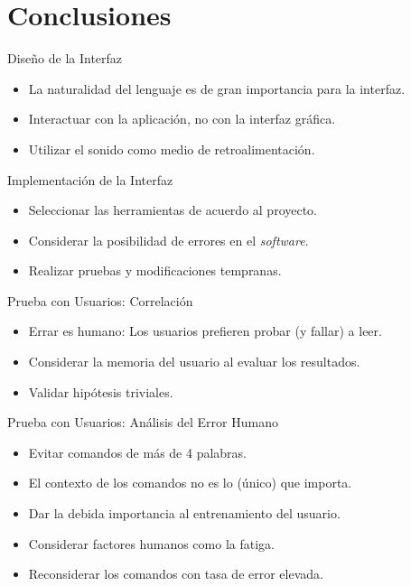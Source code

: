 \section{Conclusiones}

\begin{frame}{Dise\~no de la Interfaz}

\begin{itemize}
    \item La naturalidad del lenguaje es de gran importancia para la interfaz.
    \item Interactuar con la aplicaci\'on, no con la interfaz gr\'afica.
    \item Utilizar el sonido como medio de retroalimentaci\'on.
\end{itemize}

\end{frame}

\begin{frame}{Implementaci\'on de la Interfaz}

\begin{itemize}
    \item Seleccionar las herramientas de acuerdo al \mbox{proyecto}.
    \item Considerar la posibilidad de errores en el \emph{software}.
    \item Realizar pruebas y modificaciones tempranas.
\end{itemize}

\end{frame}

\begin{frame}{Prueba con Usuarios: Correlaci\'on}

\begin{itemize}
    \item Errar es humano: Los usuarios prefieren probar (y fallar) a leer.
    \item Considerar la memoria del usuario al evaluar los resultados.
    \item Validar hip\'otesis triviales.
\end{itemize}

\end{frame}

\begin{frame}{Prueba con Usuarios: An\'alisis del Error Humano}

\begin{itemize}
    \item Evitar comandos de m\'as de 4 palabras.
    \item El contexto de los comandos no es lo (\'unico) que importa.
    \item Dar la debida importancia al entrenamiento del usuario.
    \item Considerar factores humanos como la fatiga.
    \item Reconsiderar los comandos con tasa de error elevada.
\end{itemize}

\end{frame}

